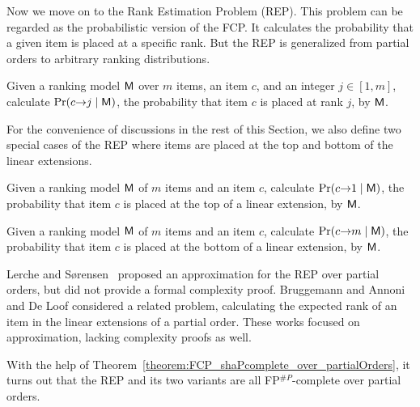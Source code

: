 Now we move on to the Rank Estimation Problem (REP).
This problem can be regarded as the probabilistic version of the FCP.
It calculates the probability that a given item is placed at a specific rank.
But the REP is generalized from partial orders to arbitrary ranking distributions.

\begin{definition}[REP]
    Given a ranking model $\mathsf{M}$ over $m$ items, an item $c$, and an integer $j \in [1, m]$, calculate $\Pr(c {\rightarrow} j \mid \mathsf{M})$, the probability that item $c$ is placed at rank $j$, by $\mathsf{M}$.
\end{definition}

For the convenience of discussions in the rest of this Section, we also define two special cases of the REP where items are placed at the top and bottom of the linear extensions.

\begin{definition}[REP-$t$]
    Given a ranking model $\mathsf{M}$ of $m$ items and an item $c$, calculate $\Pr(c {\rightarrow} 1 \mid \mathsf{M})$, the probability that item $c$ is placed at the top of a linear extension, by $\mathsf{M}$.
\end{definition}

\begin{definition}[REP-$b$]
	Given a ranking model $\mathsf{M}$ of $m$ items and an item $c$, calculate $\Pr(c {\rightarrow} m \mid \mathsf{M})$, the probability that item $c$ is placed at the bottom of a linear extension, by $\mathsf{M}$.
\end{definition}

Lerche and S{\o}rensen~\cite{lerche2003evaluation} proposed an approximation for the REP over partial orders, but did not provide a formal complexity proof.
Bruggemann and Annoni~\cite{bruggemann2014average} and De Loof \etal \cite{de2011approximation} considered a related problem, calculating the expected rank of an item in the linear extensions of a partial order.
These works focused on approximation, lacking complexity proofs as well.

With the help of Theorem~\ref{theorem:FCP_shaPcomplete_over_partialOrders}, it turns out that the REP and its two variants are all FP$^{\#P}$-complete over partial orders.

\def\lemmaREPtHardnessOverPartialOrders{
    If ranking model $\model$ is a partial order $\partialOrder$ of $m$ items representing a uniform distribution of $\Omega(\partialOrder)$, the REP-t is FP$^{\#P}$-complete.
}

